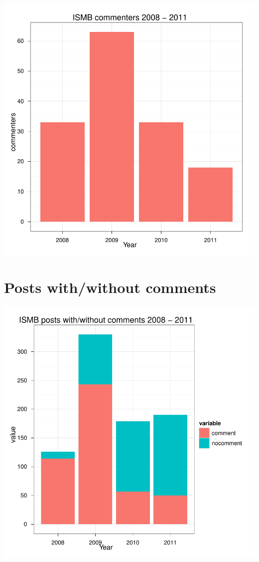 \documentclass[a4paper,10pt]{article}
\begin{document}
\begin{center}
\includegraphics{ismb-006}
\end{center}

\section{Posts with/without comments}

\begin{center}
\includegraphics{ismb-008}
\end{center}
\end{document}
